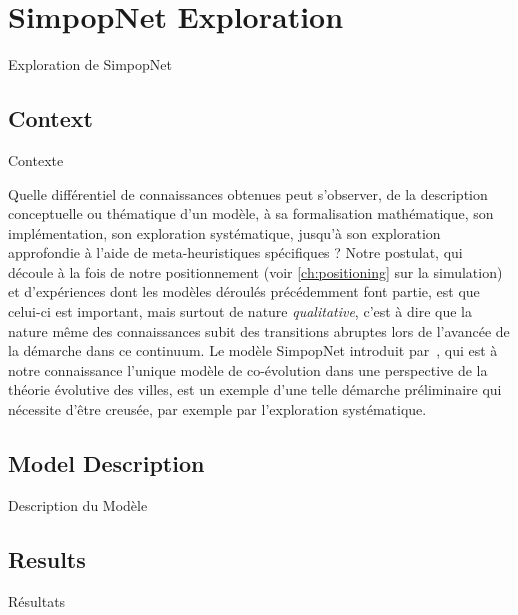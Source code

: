 




\newpage


\section[SimpopNet Exploration][Exploration de SimpopNet]{SimpopNet Exploration}{Exploration de SimpopNet}



\subsection{Context}{Contexte}

Quelle différentiel de connaissances obtenues peut s'observer, de la description conceptuelle ou thématique d'un modèle, à sa formalisation mathématique, son implémentation, son exploration systématique, jusqu'à son exploration approfondie à l'aide de meta-heuristiques spécifiques ? Notre postulat, qui découle à la fois de notre positionnement (voir \autoref{ch:positioning} sur la simulation) et d'expériences dont les modèles déroulés précédemment font partie, est que celui-ci est important, mais surtout de nature \emph{qualitative}, c'est à dire que la nature même des connaissances subit des transitions abruptes lors de l'avancée de la démarche dans ce continuum. Le modèle SimpopNet introduit par~\cite{schmitt2014modelisation}, qui est à notre connaissance l'unique modèle de co-évolution dans une perspective de la théorie évolutive des villes, est un exemple d'une telle démarche préliminaire qui nécessite d'être creusée, par exemple par l'exploration systématique.


\subsection{Model Description}{Description du Modèle}


\subsection{Results}{Résultats}




